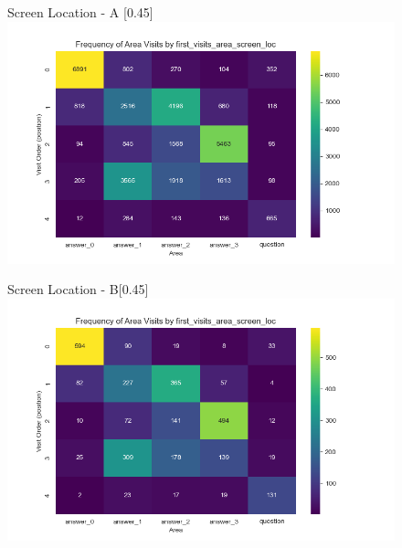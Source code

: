 \documentclass{article}
\begin{document}
\begin{figure}[H]
  \centering
  \begin{subcaptionbox}{Screen Location - A \label{fig:sl_a}}[0.45\textwidth]
    {\centering\includegraphics[width=\linewidth]{plots/visits/matrix_first_visits_first_visits_area_screen_loc_hunters_A (hunters).png}}
  \end{subcaptionbox}
  \hfill
  \begin{subcaptionbox}{Screen Location - B\label{fig:sl_b}}[0.45\textwidth]
    {\centering\includegraphics[width=\linewidth]{plots/visits/matrix_first_visits_first_visits_area_screen_loc_hunters_B (hunters).png}}
  \end{subcaptionbox}
  
  \vspace{1em} %


\end{figure}
\end{document}
